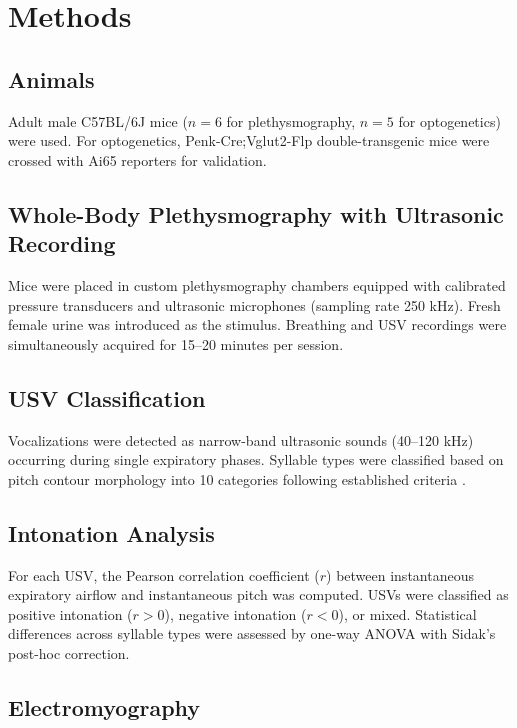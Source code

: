 \documentclass[11pt]{article}
\begin{document}
\section{Methods}

\subsection{Animals}

Adult male C57BL/6J mice ($n = 6$ for plethysmography, $n = 5$ for optogenetics) were used. For optogenetics, Penk-Cre;Vglut2-Flp double-transgenic mice were crossed with Ai65 reporters for validation.

\subsection{Whole-Body Plethysmography with Ultrasonic Recording}

Mice were placed in custom plethysmography chambers equipped with calibrated pressure transducers and ultrasonic microphones (sampling rate 250 kHz). Fresh female urine was introduced as the stimulus. Breathing and USV recordings were simultaneously acquired for 15--20 minutes per session.

\subsection{USV Classification}

Vocalizations were detected as narrow-band ultrasonic sounds (40--120 kHz) occurring during single expiratory phases. Syllable types were classified based on pitch contour morphology into 10 categories following established criteria \citep{grimsley2011temporal}.

\subsection{Intonation Analysis}

For each USV, the Pearson correlation coefficient ($r$) between instantaneous expiratory airflow and instantaneous pitch was computed. USVs were classified as positive intonation ($r > 0$), negative intonation ($r < 0$), or mixed. Statistical differences across syllable types were assessed by one-way ANOVA with Sidak's post-hoc correction.

\subsection{Electromyography}
\end{document}
